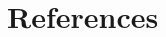 \documentclass[openany,11pt]{Latex/classes/PhDthesisPSnPDF}
\begin{document}
	
	
	
	
	
	
	
	
	
	
	
	
	
	
	
	\chapter*{References} %
	\begin{multicols}{2} 
	\begin{tiny} %
	\renewcommand{\bibname}{\vspace{-34mm}} %
    
	
	\end{tiny}
	\end{multicols}
	
%	
	
	
	
	\pagebreak
	
\end{document}
